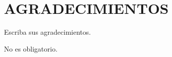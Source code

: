 \chapter*{AGRADECIMIENTOS}

Escriba sus agradecimientos.

No es obligatorio.

\thispagestyle{empty}

% 